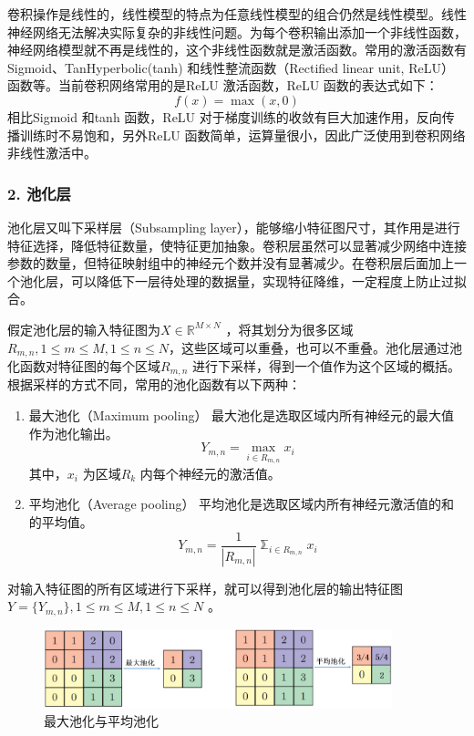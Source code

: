 卷积操作是线性的，线性模型的特点为任意线性模型的组合仍然是线性模型。线性神经网络无法解决实际复杂的非线性问题。为每个卷积输出添加一个非线性函数，神经网络模型就不再是线性的，这个非线性函数就是激活函数。常用的激活函数有Sigmoid、TanHyperbolic(tanh) 和线性整流函数（Rectified linear unit, ReLU） 函数等。当前卷积网络常用的是ReLU 激活函数，ReLU 函数的表达式如下：
\begin{equation}
  \label{eq:2-17-1}
  f(x) = \max(x,0)
\end{equation}
相比Sigmoid 和tanh 函数，ReLU 对于梯度训练的收敛有巨大加速作用，反向传播训练时不易饱和，另外ReLU 函数简单，运算量很小，因此广泛使用到卷积网络非线性激活中。

\subsubsection*{2. 池化层}
\label{subsec:chap02-2-1-2}
池化层又叫下采样层（Subsampling layer），能够缩小特征图尺寸，其作用是进行特征选择，降低特征数量，使特征更加抽象。卷积层虽然可以显著减少网络中连接参数的数量，但特征映射组中的神经元个数并没有显著减少。在卷积层后面加上一个池化层，可以降低下一层待处理的数据量，实现特征降维，一定程度上防止过拟合。

假定池化层的输入特征图为$X \in \mathbb{R}^{M \times N}$ ，将其划分为很多区域$R_{m,n},1 \leq m \leq M, 1 \leq n \leq N$，这些区域可以重叠，也可以不重叠。池化层通过池化函数对特征图的每个区域$R_{m,n}$ 进行下采样，得到一个值作为这个区域的概括。根据采样的方式不同，常用的池化函数有以下两种：
\begin{enumerate}[1. ]
\label{list:1}
\item 最大池化（Maximum pooling）
最大池化是选取区域内所有神经元的最大值作为池化输出。
\begin{equation}
  \label{eq:2-18}
  Y_{m,n} = \mathop{\max}_{i \in R_{m,n}} x_i
\end{equation}
其中，$x_i$ 为区域$R_k$ 内每个神经元的激活值。

\item 平均池化（Average pooling）
平均池化是选取区域内所有神经元激活值的和的平均值。
\begin{equation}
  \label{eq:2-19}
  Y_{m,n} =  \frac{1}{|R_{m,n}|}\mathbb{\sum}_{i \in R_{m,n}} x_i
\end{equation}
\end{enumerate}
对输入特征图的所有区域进行下采样，就可以得到池化层的输出特征图$Y = \{ Y_{m,n}\},1 \leq m \leq M, 1 \leq n \leq N$ 。

\begin{figure}[htbp]
  \centering
  \includegraphics[width=0.9\textwidth]{figures/pooling}
  \caption{最大池化与平均池化}\label{fig:pooling}
\end{figure}

